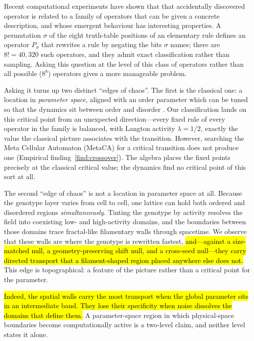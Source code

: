 \documentclass[man,12pt,floatsintext,donotrepeattitle]{apa7}
\newcommand{\artifact}[1]{{\sethlcolor{markArtifact}\hl{#1}}}
\newcommand{\sig}{\sigma}
\begin{document}
Recent computational experiments have shown that that accidentally
discovered operator is related to a family of operators that can be
given a concrete description, and whose emergent behaviour has
interesting properties.  A permutation $\sig$ of the eight truth-table
positions of an elementary rule defines an operator $P_\sig$ that
rewrites a rule by negating the bits $\sig$ names; there are $8! =
40{,}320$ such operators, and they admit exact classification rather
than sampling.  Asking this question at the level of this class of
operators rather than all possible ($8^8$) operators gives a more
manageable problem.

Asking it turns up two distinct ``edges of chaos''.  The first is the
classical one: a location in \emph{parameter space}, aligned with an
order parameter which can be tuned so that the dynamics sit between
order and disorder \parencite{langton1990computation}.  Our
classification lands on this critical point from an unexpected
direction---every fixed rule of every operator in the family is
balanced, with Langton activity $\lambda = 1/2$, exactly the value the
classical picture associates with the transition.  However, searching
the Meta Cellular Automaton (MetaCA) for a critical transition does
not produce one (Empirical finding~\ref{find:crossover}). The algebra
places the fixed points precisely at the classical critical value; the
dynamics find no critical point of this sort at all.

The second ``edge of chaos'' is not a location in parameter space at
all. Because the genotype layer varies from cell to cell, one lattice
can hold both ordered and disordered regions \emph{simultaneously}.
Tinting the genotype by activity resolves the field into coexisting
low- and high-activity domains, and the boundaries between those
domains trace fractal-like filamentary walls through spacetime.  We
observe that these walls are where the genotype is rewritten fastest,
\artifact{and---against a size-matched null, a geometry-preserving shift
null, and a cross-seed null---they carry directed transport that a
filament-shaped region placed anywhere else does not.}  This edge is
topographical: a feature of the picture rather than a critical point
for the parameter.

\artifact{Indeed, the spatial walls carry the most transport when the global
parameter sits in an intermediate band.  They lose their specificity when noise
dissolves the domains that define them.}  A parameter-space
region in which physical-space boundaries become computationally
active is a two-level claim, and neither level states it alone.
\end{document}
